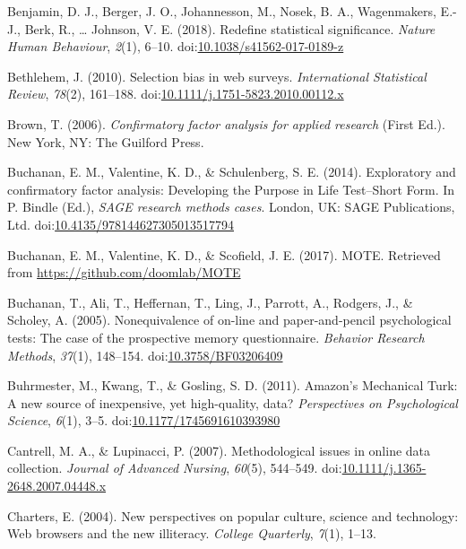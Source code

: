 \documentclass[english,man]{apa6}
\theoremstyle{definition}
\theoremstyle{definition}
\theoremstyle{definition}
\theoremstyle{remark}
\begin{document}
\hypertarget{ref-Benjamin2017}{}
Benjamin, D. J., Berger, J. O., Johannesson, M., Nosek, B. A.,
Wagenmakers, E.-J., Berk, R., \ldots{} Johnson, V. E. (2018). Redefine
statistical significance. \emph{Nature Human Behaviour}, \emph{2}(1),
6--10.
doi:\href{https://doi.org/10.1038/s41562-017-0189-z}{10.1038/s41562-017-0189-z}

\hypertarget{ref-Bethlehem2010}{}
Bethlehem, J. (2010). Selection bias in web surveys. \emph{International
Statistical Review}, \emph{78}(2), 161--188.
doi:\href{https://doi.org/10.1111/j.1751-5823.2010.00112.x}{10.1111/j.1751-5823.2010.00112.x}

\hypertarget{ref-Brown2006}{}
Brown, T. (2006). \emph{Confirmatory factor analysis for applied
research} (First Ed.). New York, NY: The Guilford Press.

\hypertarget{ref-Buchanan2014}{}
Buchanan, E. M., Valentine, K. D., \& Schulenberg, S. E. (2014).
Exploratory and confirmatory factor analysis: Developing the Purpose in
Life Test--Short Form. In P. Bindle (Ed.), \emph{SAGE research methods
cases}. London, UK: SAGE Publications, Ltd.
doi:\href{https://doi.org/10.4135/978144627305013517794}{10.4135/978144627305013517794}

\hypertarget{ref-Buchanan2017}{}
Buchanan, E. M., Valentine, K. D., \& Scofield, J. E. (2017). MOTE.
Retrieved from \url{https://github.com/doomlab/MOTE}

\hypertarget{ref-Buchanan2005}{}
Buchanan, T., Ali, T., Heffernan, T., Ling, J., Parrott, A., Rodgers,
J., \& Scholey, A. (2005). Nonequivalence of on-line and
paper-and-pencil psychological tests: The case of the prospective memory
questionnaire. \emph{Behavior Research Methods}, \emph{37}(1), 148--154.
doi:\href{https://doi.org/10.3758/BF03206409}{10.3758/BF03206409}

\hypertarget{ref-Buhrmester2011}{}
Buhrmester, M., Kwang, T., \& Gosling, S. D. (2011). Amazon's Mechanical
Turk: A new source of inexpensive, yet high-quality, data?
\emph{Perspectives on Psychological Science}, \emph{6}(1), 3--5.
doi:\href{https://doi.org/10.1177/1745691610393980}{10.1177/1745691610393980}

\hypertarget{ref-Cantrell2007}{}
Cantrell, M. A., \& Lupinacci, P. (2007). Methodological issues in
online data collection. \emph{Journal of Advanced Nursing},
\emph{60}(5), 544--549.
doi:\href{https://doi.org/10.1111/j.1365-2648.2007.04448.x}{10.1111/j.1365-2648.2007.04448.x}

\hypertarget{ref-Charters2004}{}
Charters, E. (2004). New perspectives on popular culture, science and
technology: Web browsers and the new illiteracy. \emph{College
Quarterly}, \emph{7}(1), 1--13.
\end{document}
